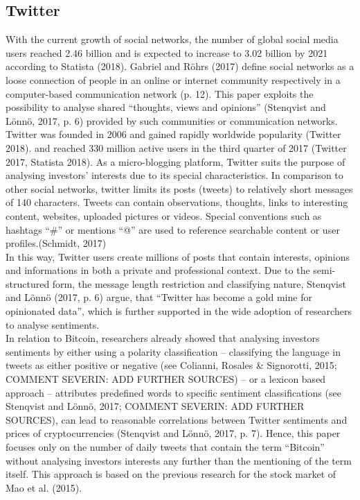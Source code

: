 \documentclass[a4paper,american,12pt]{article}
\begin{document}
\begin{spacing}{1.2}
\subsection{Twitter}
With the current growth of social networks, the number of global social media users reached 2.46 billion and is expected to increase to 3.02 billion by 2021 according to Statista (2018). Gabriel and Röhrs (2017) define social networks as a loose connection of people in an online or internet community respectively in a computer-based communication network (p. 12). This paper exploits the possibility to analyse shared “thoughts, views and opinions” (Stenqvist and Lönnö, 2017, p. 6) provided by such communities or communication networks.\\

Twitter was founded in 2006 and gained rapidly worldwide popularity (Twitter 2018). and reached 330 million active users in the third quarter of 2017 (Twitter 2017, Statista 2018). As a micro-blogging platform, Twitter suits the purpose of analysing investors’ interests due to its special characteristics. In comparison to other social networks, twitter limits its posts (tweets) to relatively short messages of 140 characters. Tweets can contain observations, thoughts, links to interesting content, websites, uploaded pictures or videos. Special conventions such as hashtags “\#” or mentions “@” are used to reference searchable content or user profiles.(Schmidt, 2017)\\

In this way, Twitter users create millions of posts that contain interests, opinions and informations in both a private and professional context.  Due to the semi-structured form, the message length restriction and classifying nature, Stenqvist and Lönnö (2017, p. 6) argue, that “Twitter has become a gold mine for opinionated data”, which is further supported in the wide adoption of researchers to analyse sentiments.\\

In relation to Bitcoin, researchers already showed that analysing investors sentiments by either using a polarity classification – classifying the language in tweets as either positive or negative (see Colianni, Rosales \& Signorotti, 2015; COMMENT SEVERIN: ADD FURTHER SOURCES) – or a lexicon based approach – attributes predefined words to specific sentiment classifications (see Stenqvist and Lönnö, 2017; COMMENT SEVERIN: ADD FURTHER SOURCES), can lead to reasonable correlations between Twitter sentiments and prices of cryptocurrencies (Stenqvist and Lönnö, 2017, p. 7). Hence, this paper focuses only on the number of daily tweets that contain the term “Bitcoin” without analysing investors interests any further than the mentioning of the term itself. This approach is based on the previous research for the stock market of Mao et al. (2015).\\



\end{spacing}
\end{document}
